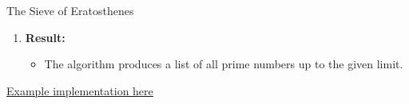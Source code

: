\begin{exmp}{The Sieve of Eratosthenes}
\begin{enumerate}
  \item \textbf{Result:}
    \begin{itemize}
      \item The algorithm produces a list of all prime numbers up to the given limit.
    \end{itemize}
\end{enumerate}
\href{https://pythontutor.com/render.html#code=def%20sieve_of_eratosthenes%28limit%29%3A%0A%20%20%20%20primes%20%3D%20%5B%5D%0A%20%20%20%20is_prime%20%3D%20%5B1%5D%20*%20%28limit%20%2B%201%29%0A%20%20%20%20is_prime%5B0%5D%20%3D%20is_prime%5B1%5D%20%3D%200%0A%0A%20%20%20%20for%20number%20in%20range%282,%20int%28limit**0.5%29%20%2B%201%29%3A%0A%20%20%20%20%20%20%20%20if%20is_prime%5Bnumber%5D%3A%0A%20%20%20%20%20%20%20%20%20%20%20%20primes.append%28number%29%0A%20%20%20%20%20%20%20%20%20%20%20%20for%20multiple%20in%20range%28number%20*%20number,%20limit%20%2B%201,%20number%29%3A%0A%20%20%20%20%20%20%20%20%20%20%20%20%20%20%20%20is_prime%5Bmultiple%5D%20%3D%200%0A%0A%20%20%20%20for%20number%20in%20range%28int%28limit**0.5%29%20%2B%201,%20limit%20%2B%201%29%3A%0A%20%20%20%20%20%20%20%20if%20is_prime%5Bnumber%5D%3A%0A%20%20%20%20%20%20%20%20%20%20%20%20primes.append%28number%29%0A%0A%20%20%20%20return%20primes%0A%0A%23%20Example%20usage%3A%0Alimit%20%3D%2020%0Aresult%20%3D%20sieve_of_eratosthenes%28limit%29%0Aprint%28%22Prime%20numbers%20up%20to%22,%20limit,%20%22are%3A%22,%20result%29&cumulative=true&curInstr=0&heapPrimitives=false&mode=display&origin=opt-frontend.js&py=3&rawInputLstJSON=%5B%5D&textReferences=true}{Example implementation here}
\end{exmp}

